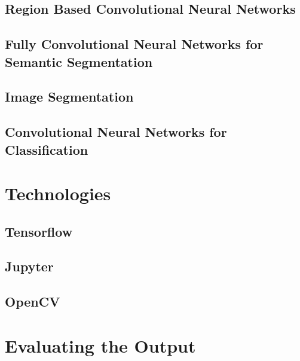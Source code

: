 \subsection{Region Based Convolutional Neural Networks}

\subsection{Fully Convolutional Neural Networks for Semantic Segmentation}

\subsection{Image Segmentation}

\subsection{Convolutional Neural Networks for Classification}


\section{Technologies}
\subsection{Tensorflow}

\subsection{Jupyter}

\subsection{OpenCV}


\section{Evaluating the Output}


